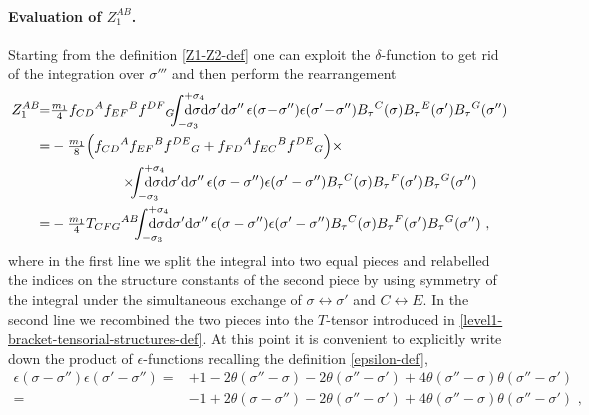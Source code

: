 \documentclass[12pt]{article}
\numberwithin{equation}{section}
\begin{document}
\paragraph{Evaluation of $Z_{1}^{AB}$.}
Starting from the definition \eqref{Z1-Z2-def} one can exploit the $\delta$-function to get rid of the integration over $\sigma'''$ and then perform the rearrangement
\begin{align}\label{Z1-first-rearrangement}
Z_{1}^{AB}\!\!=&\tfrac{m_{1}}{4}f_{CD}{}^{A}f_{EF}{}^{B}f^{DF}{}_{G}\!\!\!\int_{-\sigma_{3}}^{+\sigma_{4}}\!\!\!\!\!\!\!\!\!\!\mathrm{d}\sigma\mathrm{d}\sigma' \mathrm{d}\sigma''  \, \epsilon(\sigma\!-\!\sigma'')\epsilon(\sigma'\!-\!\sigma'')B_{\tau}{}^{C}(\sigma)B_{\tau}{}^{E}(\sigma')B_{\tau}{}^{G}(\sigma'')
\notag \\
=& -\tfrac{m_{1}}{8}\Bigl( f_{CD}{}^{A}f_{EF}{}^{B}f^{DE}{}_{G} +f_{FD}{}^{A}f_{EC}{}^{B}f^{DE}{}_{G}\Bigr)\times
\notag \\
& \qquad \qquad \quad \times \!\!\!\int_{-\sigma_{3}}^{+\sigma_{4}}\!\!\!\!\!\!\!\!\!\!\mathrm{d}\sigma\mathrm{d}\sigma' \mathrm{d}\sigma''  \, \epsilon(\sigma-\sigma'')\epsilon(\sigma'-\sigma'')B_{\tau}{}^{C}(\sigma)B_{\tau}{}^{F}(\sigma')B_{\tau}{}^{G}(\sigma'')
\notag \\
=& -\tfrac{m_{1}}{4}T_{CFG}{}^{AB}\!\!\!\int_{-\sigma_{3}}^{+\sigma_{4}}\!\!\!\!\!\!\!\!\!\!\mathrm{d}\sigma\mathrm{d}\sigma' \mathrm{d}\sigma''  \, \epsilon(\sigma-\sigma'')\epsilon(\sigma'-\sigma'')B_{\tau}{}^{C}(\sigma)B_{\tau}{}^{F}(\sigma')B_{\tau}{}^{G}(\sigma'') \,\, ,
\end{align}
where in the first line we split the integral into two equal pieces and relabelled the indices on the structure constants of the second piece by using symmetry of the integral under the simultaneous exchange of $\sigma \leftrightarrow \sigma'$ and $C\leftrightarrow E$. In the second line we recombined the two pieces into the $T$-tensor introduced in \eqref{level1-bracket-tensorial-structures-def}. At this point it is convenient to explicitly write down the product of $\epsilon$-functions recalling the definition \eqref{epsilon-def},
\begin{equation}
\begin{aligned}
\epsilon(\sigma-\sigma'')\epsilon(\sigma'-\sigma'')=&+1-2\theta(\sigma''-\sigma)-2\theta(\sigma''-\sigma')+4\theta(\sigma''-\sigma)\theta(\sigma''-\sigma')
\\
=& -1+2\theta(\sigma-\sigma'')-2\theta(\sigma''-\sigma')+4\theta(\sigma''-\sigma)\theta(\sigma''-\sigma') \,\, ,
\end{aligned}
\end{equation}
\end{document}
